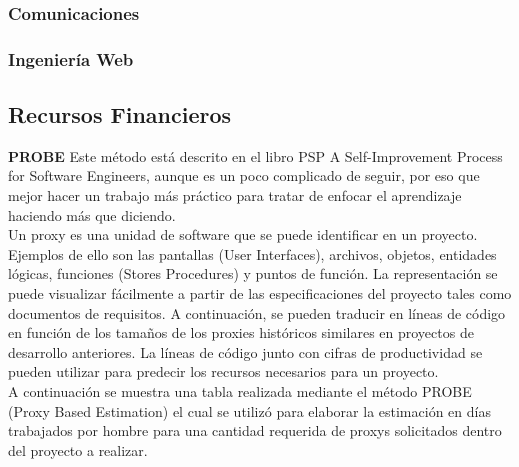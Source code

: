 \subsubsection*{Comunicaciones}

\subsubsection*{Ingenier\'ia Web}


\subsection{Recursos Financieros} 
\textbf{PROBE}
\newline
Este método est\'a descrito en el libro PSP A Self-Improvement Process for Software Engineers, aunque es un poco complicado de seguir, por eso que mejor hacer un trabajo m\'as pr\'actico para tratar de enfocar el aprendizaje haciendo m\'as que diciendo.\\

Un proxy es una unidad de software que se puede identificar en un proyecto. Ejemplos de ello son las pantallas (User Interfaces), archivos, objetos, entidades l\'ogicas, funciones (Stores Procedures) y puntos de funci\'on. La representaci\'on se puede visualizar f\'acilmente a partir de las especificaciones del proyecto tales como documentos de requisitos. A continuaci\'on, se pueden traducir en l\'ineas de c\'odigo en funci\'on de los tamaños de los proxies hist\'oricos similares en proyectos de desarrollo anteriores. La l\'ineas de c\'odigo junto con cifras de productividad se pueden utilizar para predecir los recursos necesarios para un proyecto.\\

A continuaci\'on se muestra una tabla realizada mediante el m\'etodo PROBE (Proxy Based Estimation) el cual se utiliz\'o para elaborar la estimaci\'on en d\'ias trabajados por hombre para una cantidad requerida de proxys solicitados dentro del proyecto a realizar.


